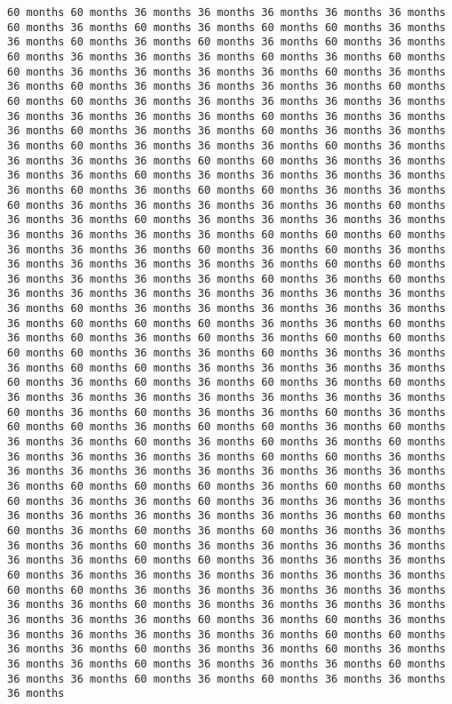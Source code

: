 \documentclass[11pt]{article}
\begin{document}
\begin{Verbatim}[commandchars=\\\{\}, frame=single, framerule=2mm, rulecolor=\color{outerrorbackground}]
60 months 60 months 36 months 36 months 36 months 36 months 36 months 60 months 36 months 60 months 36 months 60 months 60 months 36 months 36 months 60 months 36 months 60 months 36 months 60 months 36 months 60 months 36 months 36 months 36 months 60 months 36 months 60 months 60 months 36 months 36 months 36 months 36 months 60 months 36 months 36 months 60 months 36 months 36 months 36 months 36 months 60 months 60 months 60 months 36 months 36 months 36 months 36 months 36 months 36 months 36 months 36 months 36 months 60 months 36 months 36 months 36 months 60 months 36 months 36 months 60 months 36 months 36 months 36 months 60 months 36 months 36 months 36 months 60 months 36 months 36 months 36 months 36 months 60 months 60 months 36 months 36 months 36 months 36 months 60 months 36 months 36 months 36 months 36 months 36 months 60 months 36 months 60 months 60 months 36 months 36 months 60 months 36 months 36 months 36 months 36 months 36 months 60 months 36 months 36 months 60 months 36 months 36 months 36 months 36 months 36 months 36 months 36 months 36 months 60 months 60 months 60 months 36 months 36 months 36 months 60 months 36 months 60 months 36 months 36 months 36 months 36 months 36 months 36 months 60 months 60 months 36 months 36 months 36 months 36 months 60 months 36 months 60 months 36 months 36 months 36 months 36 months 36 months 36 months 36 months 36 months 60 months 36 months 36 months 36 months 36 months 36 months 36 months 60 months 60 months 60 months 36 months 36 months 60 months 36 months 60 months 36 months 60 months 36 months 60 months 60 months 60 months 60 months 36 months 36 months 60 months 36 months 36 months 36 months 60 months 60 months 36 months 36 months 36 months 36 months 60 months 36 months 60 months 36 months 60 months 36 months 60 months 36 months 36 months 36 months 36 months 36 months 36 months 36 months 60 months 36 months 60 months 36 months 36 months 60 months 36 months 60 months 60 months 36 months 60 months 60 months 36 months 60 months 36 months 36 months 60 months 36 months 60 months 36 months 60 months 36 months 36 months 36 months 36 months 60 months 60 months 36 months 36 months 36 months 36 months 36 months 36 months 36 months 36 months 36 months 60 months 60 months 60 months 36 months 60 months 60 months 60 months 36 months 36 months 60 months 36 months 36 months 36 months 36 months 36 months 36 months 36 months 36 months 36 months 60 months 60 months 36 months 60 months 36 months 60 months 36 months 36 months 36 months 36 months 60 months 36 months 36 months 36 months 36 months 36 months 36 months 60 months 60 months 36 months 36 months 36 months 60 months 36 months 36 months 36 months 36 months 36 months 36 months 60 months 60 months 36 months 36 months 36 months 36 months 36 months 36 months 36 months 60 months 36 months 36 months 36 months 36 months 36 months 36 months 36 months 60 months 36 months 60 months 36 months 36 months 36 months 36 months 36 months 36 months 60 months 60 months 36 months 36 months 60 months 36 months 36 months 60 months 36 months 36 months 36 months 60 months 36 months 36 months 36 months 60 months 36 months 36 months 60 months 36 months 60 months 36 months 36 months 36 months 
\end{Verbatim}
\end{document}

